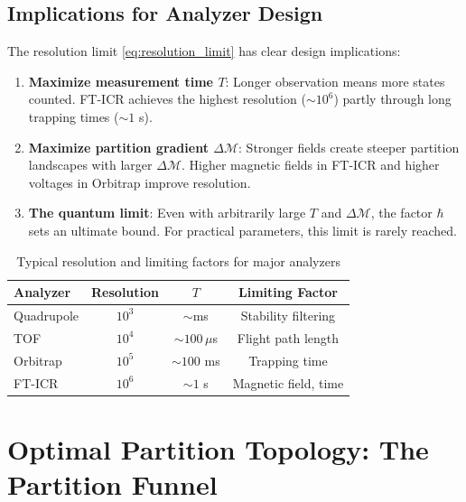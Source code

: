 \documentclass[twocolumn,10pt,a4paper]{article}
\theoremstyle{definition}
\theoremstyle{remark}
\newcommand{\Mdepth}{\mathcal{M}}
\begin{document}
\subsection{Implications for Analyzer Design}

The resolution limit \eqref{eq:resolution_limit} has clear design implications:

\begin{enumerate}
    \item \textbf{Maximize measurement time $T$}: Longer observation means more states counted. FT-ICR achieves the highest resolution ($\sim 10^6$) partly through long trapping times ($\sim 1$ s).

    \item \textbf{Maximize partition gradient $\Delta\Mdepth$}: Stronger fields create steeper partition landscapes with larger $\Delta\Mdepth$. Higher magnetic fields in FT-ICR and higher voltages in Orbitrap improve resolution.

    \item \textbf{The quantum limit}: Even with arbitrarily large $T$ and $\Delta\Mdepth$, the factor $\hbar$ sets an ultimate bound. For practical parameters, this limit is rarely reached.
\end{enumerate}

\begin{table}[h]
\centering
\caption{Typical resolution and limiting factors for major analyzers}
\label{tab:resolution}
\begin{tabular}{lccc}
\toprule
\textbf{Analyzer} & \textbf{Resolution} & \textbf{$T$} & \textbf{Limiting Factor} \\
\midrule
Quadrupole & $10^3$ & $\sim$ms & Stability filtering \\
TOF & $10^4$ & $\sim 100\,\mu$s & Flight path length \\
Orbitrap & $10^5$ & $\sim 100$ ms & Trapping time \\
FT-ICR & $10^6$ & $\sim 1$ s & Magnetic field, time \\
\bottomrule
\end{tabular}
\end{table}

\section{Optimal Partition Topology: The Partition Funnel}
\label{sec:funnel}
\end{document}
